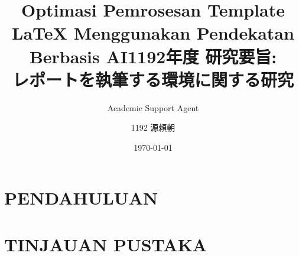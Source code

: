 \documentclass{preport}
\title{Optimasi Pemrosesan Template LaTeX Menggunakan Pendekatan Berbasis AI}
\author{Academic Support Agent}
\date{\today}
\begin{document}
\maketitle

\begin{abstract}

\end{abstract}

\chapter{PENDAHULUAN}


\chapter{TINJAUAN PUSTAKA}



\usepackage[dvipdfmx]{graphicx}

\graphicspath{{figs/}}

\title{1192年度 研究要旨:\\
レポートを執筆する環境に関する研究}
\author{1192 源頼朝}
\end{document}
